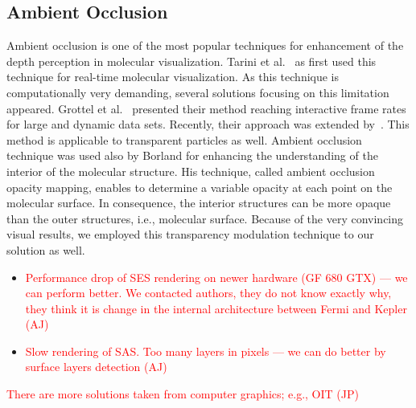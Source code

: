 \subsection{Ambient Occlusion}
Ambient occlusion is one of the most popular techniques for enhancement of the depth perception in molecular visualization.
Tarini et al.~\cite{tarini2006ambient} as first used this technique for real-time molecular visualization.
As this technique is computationally very demanding, several solutions focusing on this limitation appeared.
Grottel et al.~\cite{grottel2012object} presented their method reaching interactive frame rates for large and dynamic data sets. 
Recently, their approach was extended by~\cite{staib2015ambient}.
This method is applicable to transparent particles as well.
Ambient occlusion technique was used also by Borland\cite{borland2011ambient} for enhancing the understanding of the interior of the molecular structure.
His technique, called ambient occlusion opacity mapping, enables to determine a variable opacity at each point on the molecular surface.
In consequence, the interior structures can be more opaque than the outer structures, i.e., molecular surface.
Because of the very convincing visual results, we employed this transparency modulation technique to our solution as well.


\begin{itemize}
  \item \textcolor{red}{Performance drop of SES rendering on newer hardware (GF 680 GTX) --- we can perform better. We contacted authors, they do not know exactly why, they think it is change in the internal architecture between Fermi and Kepler (AJ)}
  \item \textcolor{red}{Slow rendering of SAS. Too many layers in pixels --- we can do better by surface layers detection (AJ)}
\end{itemize}

\textcolor{red}{There are more solutions taken from computer graphics; e.g., OIT (JP)}



